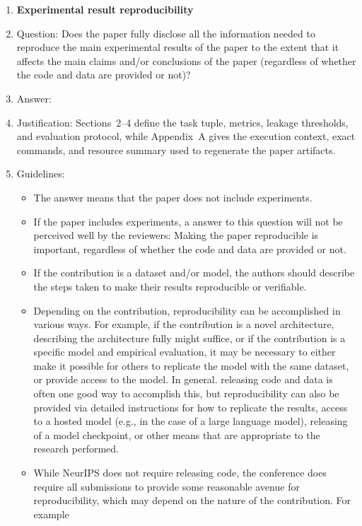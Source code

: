 \documentclass{article}
\begin{document}
\begin{enumerate}
\item {\bf Experimental result reproducibility}
    \item[] Question: Does the paper fully disclose all the information needed to reproduce the main experimental results of the paper to the extent that it affects the main claims and/or conclusions of the paper (regardless of whether the code and data are provided or not)?
    \item[] Answer: \answerYes{}
    \item[] Justification: Sections~2--4 define the task tuple, metrics, leakage thresholds, and evaluation protocol, while Appendix~A gives the execution context, exact commands, and resource summary used to regenerate the paper artifacts.
    \item[] Guidelines:
    \begin{itemize}
        \item The answer \answerNA{} means that the paper does not include experiments.
        \item If the paper includes experiments, a \answerNo{} answer to this question will not be perceived well by the reviewers: Making the paper reproducible is important, regardless of whether the code and data are provided or not.
        \item If the contribution is a dataset and\slash or model, the authors should describe the steps taken to make their results reproducible or verifiable.
        \item Depending on the contribution, reproducibility can be accomplished in various ways. For example, if the contribution is a novel architecture, describing the architecture fully might suffice, or if the contribution is a specific model and empirical evaluation, it may be necessary to either make it possible for others to replicate the model with the same dataset, or provide access to the model. In general. releasing code and data is often one good way to accomplish this, but reproducibility can also be provided via detailed instructions for how to replicate the results, access to a hosted model (e.g., in the case of a large language model), releasing of a model checkpoint, or other means that are appropriate to the research performed.
        \item While NeurIPS does not require releasing code, the conference does require all submissions to provide some reasonable avenue for reproducibility, which may depend on the nature of the contribution. For example
        \begin{enumerate}

\end{enumerate}
\end{itemize}
\end{enumerate}
\end{document}

